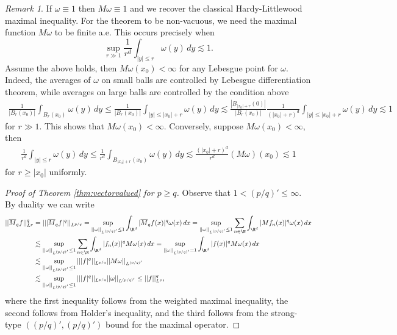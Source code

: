 \documentclass[reqno]{amsart}
\theoremstyle{definition}
\theoremstyle{remark}
\newtheorem*{remark}{Remark}
\begin{document}
\begin{remark}
	If $\omega \equiv 1$ then $M\omega \equiv 1$ and we recover the classical Hardy-Littlewood maximal inequality. For the theorem to be non-vacuous, we need the maximal function $M\omega$ to be finite a.e. This occurs precisely when 
		\[ \sup_{r \gg 1} \frac{1}{r^d} \int_{|y| \leq r} \omega(y) \, dy \lesssim 1. \]
	Assume the above holds, then $M\omega(x_0) < \infty$ for any Lebesgue point for $\omega$. Indeed, the averages of $\omega$ on small balls are controlled by Lebesgue differentiation theorem, while averages on large balls are controlled by the condition above
		\begin{align*}
			\frac{1}{|B_r (x_0)|} \int_{B_r (x_0)} \omega(y) \, dy \leq\frac{1}{|B_r (x_0)|} \int_{|y| \leq |x_0| + r} \omega(y) \, dy \lesssim \frac{|B_{|x_0| + r} (0)|}{|B_r (x_0)|} \frac{1}{(|x_0| + r)^d} \int_{|y| \leq |x_0| + r} \omega(y) \, dy \lesssim 1
		\end{align*}
	for $r \gg 1$. This shows that $M\omega(x_0) < \infty$. Conversely, suppose $M\omega(x_0) < \infty$, then 
	\begin{align*}
		\frac{1}{r^d} \int_{|y| \leq r} \omega(y) \, dy \leq \frac{1}{r^d} \int_{B_{|x_0| + r} (x_0)} \omega(y) \, dy \lesssim \frac{(|x_0| + r)^d}{r^d} (M\omega)(x_0) \lesssim 1
	\end{align*}
	for $r \geq |x_0|$ uniformly. 
\end{remark}

\begin{proof}[Proof of Theorem \ref{thm:vectorvalued} for $p \geq q$]
	Observe that $1 < (p/q)' \leq \infty$. By duality we can write
	\begin{align*}
		||\overline M_q f||_{L^p}^q
			&= || |\overline M_q f|^q ||_{L^{p/q}} = \sup_{||\omega||_{L^{(p/q)'}} \leq 1}\int_{\R^d} |\overline M_q f (x)|^q \omega(x) \, dx =\sup_{||\omega||_{L^{(p/q)'}} \leq 1} \sum_{n \in \N}  \int_{\R^d} |Mf_n (x)|^q \omega(x) \, dx \\
			&\lesssim \sup_{||\omega||_{L^{(p/q)'}} \leq 1} \sum_{n \in \N}  \int_{\R^d} |f_n (x)|^q M \omega(x) \, dx = \sup_{||\omega||_{L^{(p/q)'}} = 1} \int_{\R^d} |f(x)|^q M\omega (x) \, dx \\
			&\lesssim \sup_{||\omega||_{L^{(p/q)'}} \leq 1} || |f|^q||_{L^{p/q}} ||M\omega||_{L^{(p/q)'}} \\
			&\lesssim \sup_{||\omega||_{L^{(p/q)'}} \leq 1} || |f|^q||_{L^{p/q}} ||\omega||_{L^{(p/q)'}} \leq || f||_{L^p}^q,
	\end{align*}
where the first inequality follows from the weighted maximal inequality, the second follows from Holder's inequality, and the third follows from the strong-type $((p/q)', (p/q)')$ bound for the maximal operator. 
\end{proof}
\end{document}
